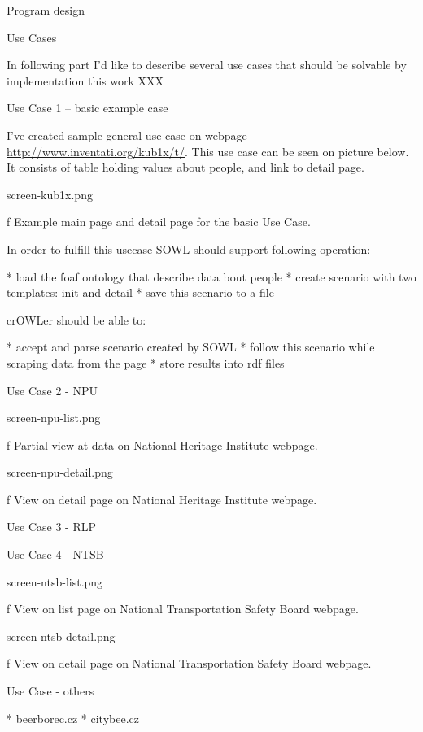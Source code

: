 
\chap Program design


\sec Use Cases

In following part I'd like to describe several use cases that should be solvable by implementation this work XXX


\secc Use Case 1 -- basic example case

I've created sample general use case on webpage
\url{http://www.inventati.org/kub1x/t/}. This use case can be seen on picture
below. It consists of table holding values about people, and link to detail
page.

\midinsert
\picw=12cm \cinspic screen-kub1x.png
\caption/f Example main page and detail page for the basic Use Case. 
\endinsert

In order to fulfill this usecase SOWL should support following operation: 

\begitems
  * load the foaf ontology that describe data bout people
  * create scenario with two templates: init and detail
  * save this scenario to a file
\enditems

crOWLer should be able to: 

\begitems
  * accept and parse scenario created by SOWL
  * follow this scenario while scraping data from the page
  * store results into rdf files
\enditems


\secc Use Case 2 - NPU

\midinsert
\picw=12cm \cinspic screen-npu-list.png
\caption/f Partial view at data on National Heritage Institute webpage. 
\endinsert

\midinsert
\picw=12cm \cinspic screen-npu-detail.png
\caption/f View on detail page on National Heritage Institute webpage. 
\endinsert


\secc Use Case 3 - RLP


\secc Use Case 4 - NTSB


\midinsert
\picw=12cm \cinspic screen-ntsb-list.png
\caption/f View on list page on National Transportation Safety Board webpage. 
\endinsert

\midinsert
\picw=12cm \cinspic screen-ntsb-detail.png
\caption/f View on detail page on National Transportation Safety Board webpage. 
\endinsert


\secc Use Case - others

\begitems
  * beerborec.cz
  * citybee.cz
\enditems



